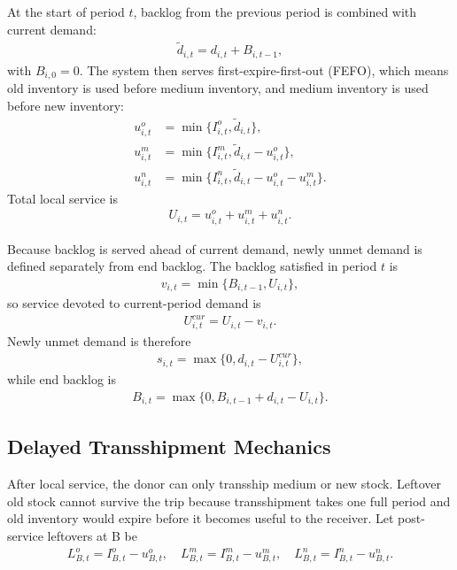 \documentclass[11pt]{article}
\begin{document}
At the start of period $t$, backlog from the previous period is combined with current demand:
\begin{align}
\tilde{d}_{i,t} = d_{i,t} + B_{i,t-1},
\end{align}
with $B_{i,0}=0$. The system then serves first-expire-first-out (FEFO), which means old inventory is used before medium inventory, and medium inventory is used before new inventory:
\begin{align}
u^o_{i,t} &= \min\{I^o_{i,t}, \tilde{d}_{i,t}\},\\
u^m_{i,t} &= \min\{I^m_{i,t}, \tilde{d}_{i,t} - u^o_{i,t}\},\\
u^n_{i,t} &= \min\{I^n_{i,t}, \tilde{d}_{i,t} - u^o_{i,t} - u^m_{i,t}\}.
\end{align}
Total local service is
\begin{align}
U_{i,t} = u^o_{i,t} + u^m_{i,t} + u^n_{i,t}.
\end{align}

Because backlog is served ahead of current demand, newly unmet demand is defined separately from end backlog. The backlog satisfied in period $t$ is
\begin{align}
v_{i,t} = \min\{B_{i,t-1}, U_{i,t}\},
\end{align}
so service devoted to current-period demand is
\begin{align}
U^{cur}_{i,t} = U_{i,t} - v_{i,t}.
\end{align}
Newly unmet demand is therefore
\begin{align}
s_{i,t} = \max\{0, d_{i,t} - U^{cur}_{i,t}\},
\end{align}
while end backlog is
\begin{align}
B_{i,t} = \max\{0, B_{i,t-1} + d_{i,t} - U_{i,t}\}.
\end{align}

\subsection{Delayed Transshipment Mechanics}
After local service, the donor can only transship medium or new stock. Leftover old stock cannot survive the trip because transshipment takes one full period and old inventory would expire before it becomes useful to the receiver. Let post-service leftovers at B be
\begin{align}
L^o_{B,t} = I^o_{B,t} - u^o_{B,t}, \quad
L^m_{B,t} = I^m_{B,t} - u^m_{B,t}, \quad
L^n_{B,t} = I^n_{B,t} - u^n_{B,t}.
\end{align}
\end{document}
